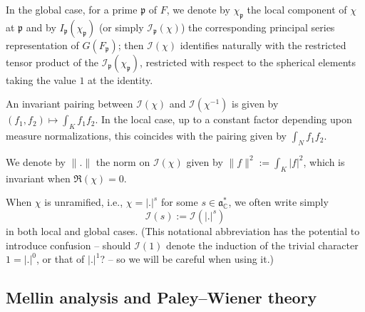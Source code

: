 In the global case, for a prime $\mathfrak{p}$ of $F$, we denote by $\chi_\mathfrak{p}$ the local component of $\chi$ at $\mathfrak{p}$ and by $I_\mathfrak{p}(\chi_\mathfrak{p})$ (or simply $\mathcal{I}_\mathfrak{p}(\chi)$) the corresponding principal series representation of $G(F_\mathfrak{p})$; then $\mathcal{I}(\chi)$ identifies naturally with the restricted tensor product of the $\mathcal{I}_\mathfrak{p}(\chi_\mathfrak{p})$, restricted with respect to the spherical elements taking the value $1$ at the identity.


An invariant pairing between $\mathcal{I}(\chi)$ and $\mathcal{I}(\chi^{-1})$ is given by $(f_1,f_2) \mapsto \int_{K} f_1 f_2$.  In the local case, up to a constant factor depending upon measure normalizations, this coincides with the pairing given by $\int_N f_1 f_2$.

We denote by $\|.\|$ the norm on $\mathcal{I}(\chi)$ given by $\|f\|^2 := \int_{K} |f|^2$, which is invariant when $\Re(\chi) = 0$.

When $\chi$ is unramified, i.e., $\chi = |.|^s$ for some $s \in \mathfrak{a}_{\mathbb{C}}^*$, we often write simply 
\begin{equation*}
  \mathcal{I}(s) := \mathcal{I}(|.|^s)
\end{equation*}
in both local and global cases.  (This notational abbreviation has the potential to introduce confusion -- should $\mathcal{I}(1)$ denote the induction of the trivial character $1 = |.|^0$, or that of $|.|^1$? -- so we will be careful when using it.)



\subsection{Mellin analysis and Paley--Wiener theory}\label{sec:mell-analys-paley}
